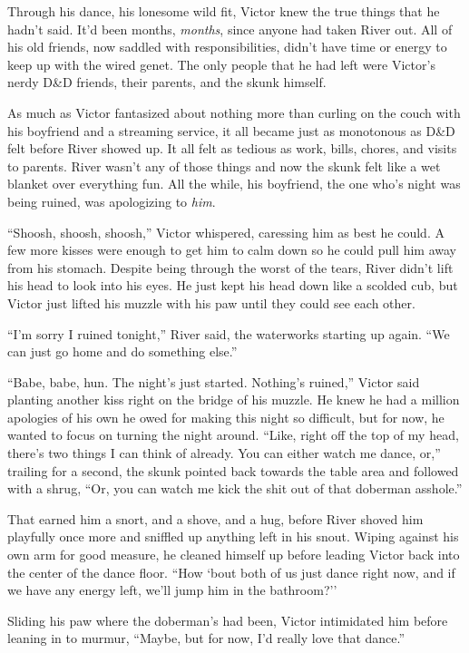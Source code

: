 Through his dance, his lonesome wild fit, Victor knew the true things
that he hadn't said. It'd been months, \emph{months}, since anyone had
taken River out. All of his old friends, now saddled with
responsibilities, didn't have time or energy to keep up with the wired
genet. The only people that he had left were Victor's nerdy D\&D
friends, their parents, and the skunk himself.

As much as Victor fantasized about nothing more than curling on the
couch with his boyfriend and a streaming service, it all became just as
monotonous as D\&D felt before River showed up. It all felt as tedious
as work, bills, chores, and visits to parents. River wasn't any of those
things and now the skunk felt like a wet blanket over everything fun.
All the while, his boyfriend, the one who's night was being ruined, was
apologizing to \emph{him}.

``Shoosh, shoosh, shoosh,'' Victor whispered, caressing him as best he
could. A few more kisses were enough to get him to calm down so he could
pull him away from his stomach. Despite being through the worst of the
tears, River didn't lift his head to look into his eyes. He just kept
his head down like a scolded cub, but Victor just lifted his muzzle with
his paw until they could see each other.

``I'm sorry I ruined tonight,'' River said, the waterworks starting up
again. ``We can just go home and do something else.''

``Babe, babe, hun. The night's just started. Nothing's ruined,'' Victor
said planting another kiss right on the bridge of his muzzle. He knew he
had a million apologies of his own he owed for making this night so
difficult, but for now, he wanted to focus on turning the night around.
``Like, right off the top of my head, there's two things I can think of
already. You can either watch me dance, or,'' trailing for a second, the
skunk pointed back towards the table area and followed with a shrug,
``Or, you can watch me kick the shit out of that doberman asshole.''

That earned him a snort, and a shove, and a hug, before River shoved him
playfully once more and sniffled up anything left in his snout. Wiping
against his own arm for good measure, he cleaned himself up before
leading Victor back into the center of the dance floor. ``How `bout both
of us just dance right now, and if we have any energy left, we'll jump
him in the bathroom?''

Sliding his paw where the doberman's had been, Victor intimidated him
before leaning in to murmur, ``Maybe, but for now, I'd really love that
dance.''

